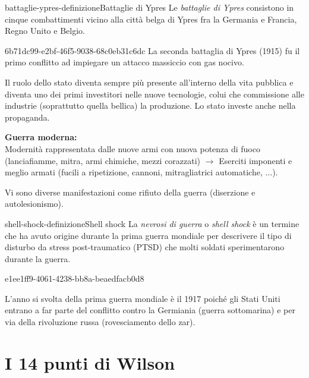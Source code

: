 \documentclass[preview]{standalone}
\begin{document}
\begin{snippetdefinition}{battaglie-ypres-definizione}{Battaglie di Ypres}
    Le \textit{battaglie di Ypres} consistono in cinque
    combattimenti vicino alla città belga di Ypres fra la Germania
    e Francia, Regno Unito e Belgio.
\end{snippetdefinition}

\begin{snippet}{6b71dc99-e2bf-46f5-9038-68c0eb31c6dc}
    La seconda battaglia di Ypres (1915) fu il primo conflitto ad impiegare
    un attacco massiccio con gas nocivo.
    
    
    Il ruolo dello stato diventa sempre più presente
    all'interno della vita pubblica e diventa uno dei primi investitori
    nelle nuove tecnologie, colui che commissione alle industrie (soprattutto quella bellica)
    la produzione.
    Lo stato investe anche nella propaganda.
    
    \textbf{Guerra moderna:} \\
    Modernità rappresentata dalle nuove armi con nuova potenza di fuoco
    (lanciafiamme, mitra, armi chimiche, mezzi corazzati)
    \(\rightarrow\) Eserciti imponenti e meglio armati (fucili a ripetizione, cannoni, mitragliatrici automatiche, ...).
    
    Vi sono diverse manifestazioni come rifiuto della guerra (diserzione e autolesionismo).
\end{snippet}

\begin{snippetdefinition}{shell-shock-definizione}{Shell shock}
    La \textit{nevrosi di guerra} o \textit{shell shock}
    è un termine che ha avuto origine durante la prima
    guerra mondiale per descrivere il tipo di disturbo da stress
    post-traumatico (PTSD) che molti soldati sperimentarono durante la guerra.
\end{snippetdefinition}

\begin{snippet}{e1ee1ff9-4061-4238-bb8a-beaedfacb0d8}

    L'anno si svolta della prima guerra mondiale è il 1917 poiché
    gli Stati Uniti entrano a far parte del conflitto contro la Germiania (guerra sottomarina)
    e per via della rivoluzione russa (rovesciamento dello zar).
\end{snippet}

\section{I 14 punti di Wilson}
\end{document}
